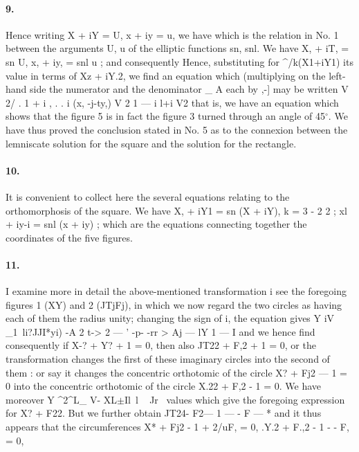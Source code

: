 \documentclass[11pt,a4paper]{book}
\begin{document}
{{{\paragraph{9.} Hence  writing
X  +  iY  =  U,     x  +  iy  =  u,
we  have
which   is   the   relation   in  No.   1    between   the   arguments    U,  u   of  the   elliptic   functions
sn,  snl.     We  have  X,  +  iT,  =  sn  U,  x,  +  iy,  =  snl  u  ;   and  consequently
Hence,  substituting  for  ^/k(X1+iY1)  its  value  in  terms  of  Xz  +  iY.2,  we  find
an  equation  which  (multiplying  on  the  left-hand  side  the  numerator  and  the  denominator
\_  A
each   by     ,-]  may  be  written
V  2/
.  1  +  i  ,         .    .
\-i         (x,  -j-ty,)
V  2  1  ---  i
l+i
V2
that  is,  we  have
an  equation  which  shows  that  the  figure  5  is  in  fact  the  figure  3  turned  through
an  angle  of  45$^\circ$.  We  have  thus  proved  the  conclusion  stated  in  No.  5  as  to  the
connexion  between  the  lemniscate  solution  for  the  square  and  the  solution  for  the
rectangle.


\paragraph{10.} It    is    convenient    to    collect    here    the     several     equations     relating     to     the
orthomorphosis  of  the  square.     We  have
X,  +  iY1  =  sn  (X  +  iY),     k  =  3  -  2  \/2  ;
xl  +  iy-i  =  snl  (x  +  iy)  ;
which  are  the  equations  connecting  together  the  coordinates  of  the  five  figures.
\paragraph{11.} I  examine  more  in  detail  the  above-mentioned  transformation
i
see  the  foregoing  figures  1  (XY)  and  2  (JTjFj),  in  which  we  now  regard  the  two
circles  as  having  each  of  them  the  radius  unity;  changing  the  sign  of  i,  the  equation
gives
Y         iV    \_1~li?JJI*yi)
-A  2  t-> 2    ---  '      -p-  -rr          >
Aj  ---  lY  1  ---  I
and  we  hence  find
consequently    if    X-?  +  Y?  +  1  =  0,    then  also    JT22  +  F,2  +  1  =  0,     or    the    transformation
changes    the    first    of    these    imaginary  circles    into    the    second    of    them  :     or    say    it
changes    the    concentric    orthotomic    of  the    circle   X?  +  Fj2  ---  1  =  0    into    the    concentric
orthotomic  of  the  circle  X.22  +  F,2  -  1  =  0.
We  have  moreover
Y                  ^2^L\_  V-        XL$\pm$Il~l
~  Jr~
values  which  give  the  foregoing  expression  for  X?  +  F22.     But  we  further  obtain
JT24-  F2---  1  ---  -  F  ---
*
and  it  thus  appears  that  the  circumferences
X*  +  Fj2  -  1  +  2/uF,  =  0,    .Y.2  +  F.,2  -  1  -  -  F,  =  0,


}}}
\end{document}
